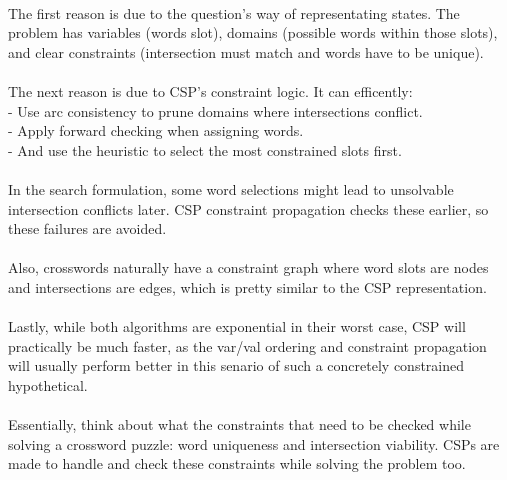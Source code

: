 \documentclass[11pt]{article}
\begin{document}
    \\
    The first reason is due to the question's way of representating states. The problem has variables (words slot), domains (possible words within those slots), and clear constraints (intersection must match and words have to be unique). \\
    \\
    The next reason is due to CSP's constraint logic. It can efficently: \\
    - Use arc consistency to prune domains where intersections conflict. \\
    - Apply forward checking when assigning words. \\
    - And use the heuristic to select the most constrained slots first. \\
    \\
    In the search formulation, some word selections might lead to unsolvable intersection conflicts later. CSP constraint propagation checks these earlier, so these failures are avoided. \\
    \\
    Also, crosswords naturally have a constraint graph where word slots are nodes and intersections are edges, which is pretty similar to the CSP representation. \\
    \\
    Lastly, while both algorithms are exponential in their worst case, CSP will practically be much faster, as the var/val ordering and constraint propagation will usually perform better in this senario of such a concretely constrained hypothetical. \\
    \\
    Essentially, think about what the constraints that need to be checked while solving a crossword puzzle: word uniqueness and intersection viability. CSPs are made to handle and check these constraints while solving the problem too.
\end{document}
